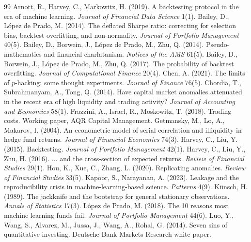 \documentclass[11pt]{article}
\begin{document}
\begin{thebibliography}{99}\small
{} Arnott, R., Harvey, C., Markowitz, H. (2019). A backtesting
protocol in the era of machine learning. \emph{Journal of Financial Data Science} 1(1).
 Bailey, D., L\'opez de Prado, M. (2014).
The deflated Sharpe ratio: correcting for selection bias, backtest overfitting, and
non-normality. \emph{Journal of Portfolio Management} 40(5).
 Bailey, D., Borwein, J., L\'opez de Prado, M., Zhu, Q.
(2014). Pseudo-mathematics and financial charlatanism. \emph{Notices of the AMS} 61(5).
 Bailey, D., Borwein, J., L\'opez de Prado, M., Zhu, Q.
(2017). The probability of backtest overfitting. \emph{Journal of Computational Finance} 20(4).
 Chen, A. (2021). The limits of $p$-hacking: some thought
experiments. \emph{Journal of Finance} 76(5).
 Chordia, T., Subrahmanyam, A., Tong, Q. (2014). Have
capital market anomalies attenuated in the recent era of high liquidity and trading activity?
\emph{Journal of Accounting and Economics} 58(1).
 Frazzini, A., Israel, R., Moskowitz, T. (2018). Trading
costs. Working paper, AQR Capital Management.
 Getmansky, M., Lo, A., Makarov, I. (2004). An
econometric model of serial correlation and illiquidity in hedge fund returns. \emph{Journal of
Financial Economics} 74(3).
 Harvey, C., Liu, Y. (2015). Backtesting. \emph{Journal of
Portfolio Management} 42(1).
 Harvey, C., Liu, Y., Zhu, H. (2016). $\ldots$ and the
cross-section of expected returns. \emph{Review of Financial Studies} 29(1).
 Hou, K., Xue, C., Zhang, L. (2020). Replicating anomalies.
\emph{Review of Financial Studies} 33(5).
 Kapoor, S., Narayanan, A. (2023). Leakage and the
reproducibility crisis in machine-learning-based science. \emph{Patterns} 4(9).
 K\"unsch, H. (1989). The jackknife and the bootstrap for
general stationary observations. \emph{Annals of Statistics} 17(3).
 L\'opez de Prado, M. (2018). The 10 reasons most
machine learning funds fail. \emph{Journal of Portfolio Management} 44(6).
 Luo, Y., Wang, S., Alvarez, M., Jussa, J., Wang, A., Rohal, G.
(2014). Seven sins of quantitative investing. Deutsche Bank Markets Research white paper.

\end{thebibliography}
\end{document}
